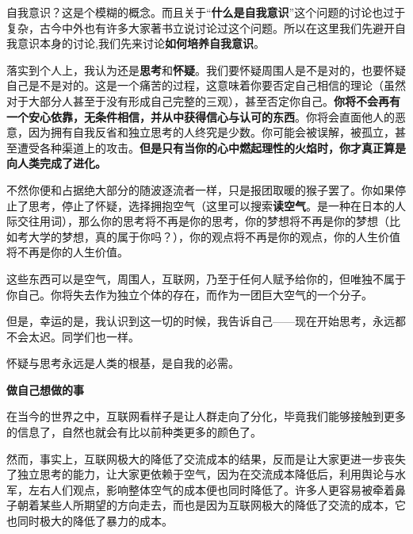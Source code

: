 \documentclass{beamer}	%
\theoremstyle{plain}
\theoremstyle{definition}
\theoremstyle{remark}
\numberwithin{equation}{section}
\begin{document}
\begin{frame}
	自我意识？这是个模糊的概念。而且关于“\textbf{什么是自我意识}”这个问题的讨论也过于复杂，古今中外也有许多大家著书立说讨论过这个问题。所以在这里我们先避开自我意识本身的讨论,我们先来讨论\textbf{如何培养自我意识}。
	\vspace{0.5cm}

	落实到个人上，我认为还是\textbf{思考}和\textbf{怀疑}。我们要怀疑周围人是不是对的，也要怀疑自己是不是对的。这是一个痛苦的过程，这意味着你要否定自己相信的理论（虽然对于大部分人甚至于没有形成自己完整的三观），甚至否定你自己。\textbf{你将不会再有一个安心依靠，无条件相信，并从中获得信心与认可的东西}。你将会直面他人的恶意，因为拥有自我反省和独立思考的人终究是少数。你可能会被误解，被孤立，甚至遭受各种渠道上的攻击。\textbf{但是只有当你的心中燃起理性的火焰时，你才真正算是向人类完成了进化。}
\end{frame}

\begin{frame}
	不然你便和占据绝大部分的随波逐流者一样，只是报团取暖的猴子罢了。你如果停止了思考，停止了怀疑，选择拥抱空气（这里可以搜索\textbf{读空气}。是一种在日本的人际交往用词），那么你的思考将不再是你的思考，你的梦想将不再是你的梦想（比如考大学的梦想，真的属于你吗？），你的观点将不再是你的观点，你的人生价值将不再是你的人生价值。
	\vspace{0.5cm}

	这些东西可以是空气，周围人，互联网，乃至于任何人赋予给你的，但唯独不属于你自己。你将失去作为独立个体的存在，而作为一团巨大空气的一个分子。
\end{frame}


\begin{frame}
	但是，幸运的是，我认识到这一切的时候，我告诉自己——现在开始思考，永远都不会太迟。同学们也一样。
	\vspace{0.5cm}

	怀疑与思考永远是人类的根基，是自我的必需。
\end{frame}

\begin{frame}
	\begin{LARGE}
		\textbf{做自己想做的事}
	\end{LARGE}
	\vspace{1cm}

	在当今的世界之中，互联网看样子是让人群走向了分化，毕竟我们能够接触到更多的信息了，自然也就会有比以前种类更多的颜色了。
	\vspace{0.5cm}
	
	然而，事实上，互联网极大的降低了交流成本的结果，反而是让大家更进一步丧失了独立思考的能力，让大家更依赖于空气，因为在交流成本降低后，利用舆论与水军，左右人们观点，影响整体空气的成本便也同时降低了。许多人更容易被牵着鼻子朝着某些人所期望的方向走去，而也是因为互联网极大的降低了交流的成本，它也同时极大的降低了暴力的成本。
\end{frame}
\end{document}
